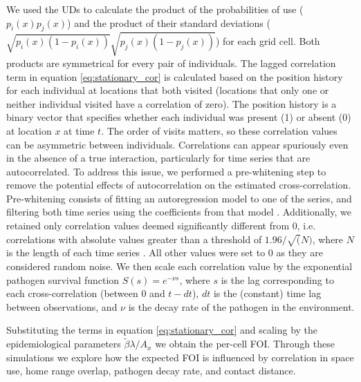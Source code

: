 \documentclass[letterpaper]{article}
\begin{document}
We used the UDs to calculate the product of the probabilities of use ($p_i(x)p_j(x)$) and the product of their standard deviations ($\sqrt{p_i(x)(1-p_i(x))}\sqrt{p_j(x)(1-p_j(x))}$) for each grid cell. Both products are symmetrical for every pair of individuals. 
The lagged correlation term in equation \ref{eq:stationary_cor} is calculated based on the position history for each individual at locations that both visited (locations that only one or neither individual visited have a correlation of zero). The position history is a binary vector that specifies whether each individual was present (1) or absent (0) at location $x$ at time $t$. 
The order of visits matters, so these correlation values can be asymmetric between individuals. 
Correlations can appear spuriously even in the absence of a true interaction, particularly for time series that are autocorrelated. To address this issue, we performed a pre-whitening step to remove the potential effects of autocorrelation on the estimated cross-correlation. Pre-whitening consists of fitting an autoregression model to one of the series, and filtering both time series using the coefficients from that model \citep{Dean2016}. Additionally, we retained only correlation values deemed significantly different from 0, i.e. correlations with absolute values greater than a threshold of $1.96/\sqrt(N)$, where $N$ is the length of each time series \citep{Dean2016}. All other values were set to 0 as they are considered random noise.
We then scale each correlation value by the exponential pathogen survival function $S(s) = e^{-\nu s}$, where $s$ is the lag corresponding to each cross-correlation (between 0 and $t-dt$), $dt$ is the (constant) time lag between observations, and $\nu$ is the decay rate of the pathogen in the environment. 

Substituting the terms in equation \ref{eq:stationary_cor} and scaling by the epidemiological parameters $\tilde\beta\lambda/ A_x$ we obtain the per-cell FOI. 
Through these simulations we explore how the expected FOI is influenced by correlation in space use, home range overlap, pathogen decay rate, and contact distance. %

\end{document}
